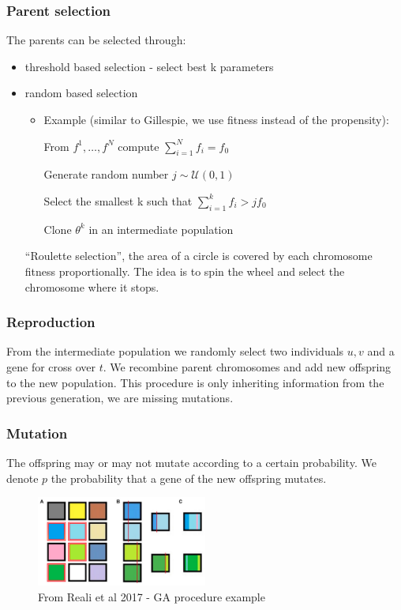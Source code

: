 \subsubsection{Parent selection}

The parents can be selected through:

\begin{itemize}
\tightlist
\item
  threshold based selection - select best k parameters
\item
  random based selection

  \begin{itemize}
  \item
    Example (similar to Gillespie, we use fitness instead of the
    propensity):

    From \(f^1,\dots,f^N\) compute \(\sum^N_{i=1}f_i=f_0\)

    Generate random number \(j \sim \mathcal{U}(0,1)\)

    Select the smallest k such that \(\sum^k_{i=1}f_i>jf_0\)

    Clone \(\theta^k\) in an intermediate population
  \end{itemize}
\noindent
  ``Roulette selection'', the area of a circle is covered by each
  chromosome fitness proportionally. The idea is to spin the wheel and
  select the chromosome where it stops.
\end{itemize}

\subsubsection{Reproduction}

From the intermediate population we randomly select two individuals
\(u,v\) and a gene for cross over \(t\). We recombine parent chromosomes
and add new offspring to the new population. This procedure is only
inheriting information from the previous generation, we are missing
mutations.

\subsubsection{Mutation}

The offspring may or may not mutate according to a certain probability.
We denote \(p\) the probability that a gene of the new offspring
mutates.

\begin{figure}
\centering
\includegraphics[width=0.5\textwidth]{ga_process.png}
\caption{From Reali et al 2017 - GA procedure example}
\end{figure}


